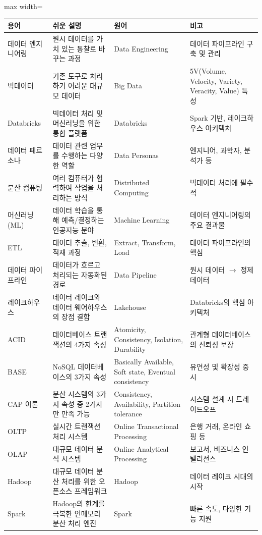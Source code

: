 \documentclass[11pt,a4paper]{article}
\begin{document}
\begin{adjustbox}{max width=\textwidth}
\begin{tabular}{llll}
\toprule
\textbf{용어} & \textbf{쉬운 설명} & \textbf{원어} & \textbf{비고} \\
\midrule
데이터 엔지니어링 & 원시 데이터를 가치 있는 통찰로 바꾸는 과정 & Data Engineering & 데이터 파이프라인 구축 및 관리 \\
빅데이터 & 기존 도구로 처리하기 어려운 대규모 데이터 & Big Data & 5V(Volume, Velocity, Variety, Veracity, Value) 특성 \\
Databricks & 빅데이터 처리 및 머신러닝을 위한 통합 플랫폼 & Databricks & Spark 기반, 레이크하우스 아키텍처 \\
데이터 페르소나 & 데이터 관련 업무를 수행하는 다양한 역할 & Data Personas & 엔지니어, 과학자, 분석가 등 \\
분산 컴퓨팅 & 여러 컴퓨터가 협력하여 작업을 처리하는 방식 & Distributed Computing & 빅데이터 처리에 필수적 \\
머신러닝 (ML) & 데이터 학습을 통해 예측/결정하는 인공지능 분야 & Machine Learning & 데이터 엔지니어링의 주요 결과물 \\
ETL & 데이터 추출, 변환, 적재 과정 & Extract, Transform, Load & 데이터 파이프라인의 핵심 \\
데이터 파이프라인 & 데이터가 흐르고 처리되는 자동화된 경로 & Data Pipeline & 원시 데이터 $\rightarrow$ 정제 데이터 \\
레이크하우스 & 데이터 레이크와 데이터 웨어하우스의 장점 결합 & Lakehouse & Databricks의 핵심 아키텍처 \\
ACID & 데이터베이스 트랜잭션의 4가지 속성 & Atomicity, Consistency, Isolation, Durability & 관계형 데이터베이스의 신뢰성 보장 \\
BASE & NoSQL 데이터베이스의 3가지 속성 & Basically Available, Soft state, Eventual consistency & 유연성 및 확장성 중시 \\
CAP 이론 & 분산 시스템의 3가지 속성 중 2가지만 만족 가능 & Consistency, Availability, Partition tolerance & 시스템 설계 시 트레이드오프 \\
OLTP & 실시간 트랜잭션 처리 시스템 & Online Transactional Processing & 은행 거래, 온라인 쇼핑 등 \\
OLAP & 대규모 데이터 분석 시스템 & Online Analytical Processing & 보고서, 비즈니스 인텔리전스 \\
Hadoop & 대규모 데이터 분산 처리를 위한 오픈소스 프레임워크 & Hadoop & 데이터 레이크 시대의 시작 \\
Spark & Hadoop의 한계를 극복한 인메모리 분산 처리 엔진 & Spark & 빠른 속도, 다양한 기능 지원 \\

\end{tabular}
\end{adjustbox}
\end{document}
